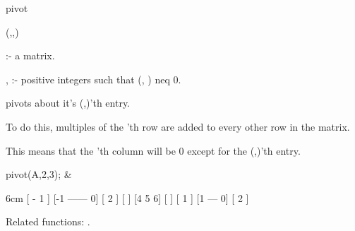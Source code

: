 \begin{Operator}{pivot}

\begin{Syntax}
(,,)
\end{Syntax}
 
     :- a matrix. 

, :- positive integers such that (,
                     ) neq 0.

 pivots  about it's (,)'th 
entry. 
 
To do this, multiples of the 'th row are added to every other 
row in the matrix. 

This means that the 'th column will be 0 except for the 
(,)'th entry. 


\begin{Examples}

pivot(A,2,3); &
\begin{multilineoutput}{6cm}
[      - 1    ]
[-1  ------  0]
[      2      ]
[             ]
[4     5     6]
[             ]
[      1      ]
[1    ---    0]
[      2      ]
\end{multilineoutput}

\end{Examples}

Related functions:
.

\end{Operator}

